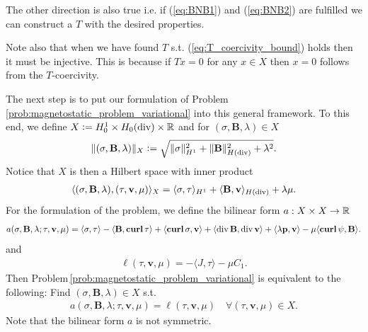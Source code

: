 \documentclass[../master_thesis.tex]{subfiles}
\begin{document}
\begin{remark}
    The other direction is also true i.e. if (\ref{eq:BNB1}) and (\ref{eq:BNB2}) 
    are fulfilled we can construct a $T$ with the desired properties.
\end{remark}

Note also that when we have found $T$ s.t. (\ref{eq:T_coercivity_bound}) holds 
then it must be injective. This is because if $Tx = 0$ for any 
$x \in X$ then $x=0$ follows from the $T$-coercivity.

The next step is to put our formulation of
Problem \ref{prob:magnetostatic_problem_variational} into 
this general framework. To this end, 
we define $X \vcentcolon= H^1_0 \times H_0(\diver) \times \real$
and for $(\sigma, \mathbf{B},\lambda) \in X$
\begin{align*}
    \lVert (\sigma, \mathbf{B}, \lambda) \rVert _X 
    \vcentcolon= \sqrt{\lVert \sigma \rVert^2_{H^1} + \lVert \mathbf{B} \rVert^2_{H(\diver)}
    + \lambda^2}.
\end{align*}
Notice that $X$ is then a Hilbert space with inner product 
\begin{align*}
    \langle (\sigma,\mathbf{B},\lambda), (\tau, \mathbf{v},\mu) \rangle _X 
    = \langle \sigma, \tau \rangle _{H^1} + \langle \mathbf{B}, \mathbf{v} \rangle _{H(\diver)} + \lambda \mu.
\end{align*}
For the formulation of the problem, we define the
bilinear form $a:X\times X \rightarrow \real$
\begin{align}
    a(\sigma,\mathbf{B}, \lambda;\tau,\mathbf{v},\mu) 
    =   \langle \sigma, \tau \rangle - \langle \mathbf{B}, \veccurl\tau \rangle
        + \langle \veccurl\sigma, \mathbf{v} \rangle + \langle \diver \mathbf{B}, \diver \mathbf{v} \rangle 
        + \langle \lambda \mathbf{p}, \mathbf{v} \rangle - \mu \langle \veccurl \psi, \mathbf{B} \rangle.
        \label{eq:definition_bilinear_form}
\end{align}
and 
\begin{align*}
    \ell(\tau,\mathbf{v},\mu) = -\langle J, \tau \rangle - \mu C_1.
\end{align*}
Then Problem\,\ref{prob:magnetostatic_problem_variational}
is equivalent to the following: Find $(\sigma,\mathbf{B},\lambda) \in 
X$ s.t.
\begin{align*}
    a(\sigma,\mathbf{B},\lambda;\tau,\mathbf{v},\mu) = \ell(\tau,\mathbf{v},\mu)
        \quad \forall (\tau,\mathbf{v},\mu) \in X.
\end{align*}
Note that the bilinear form $a$ is not symmetric. 
\end{document}
